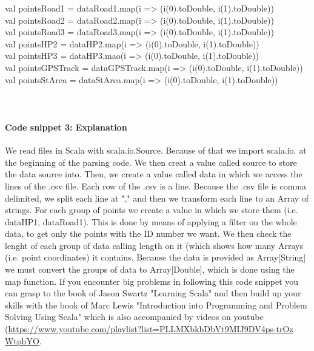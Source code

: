 \documentclass {article}
\begin{document}
val pointsRoad1 = dataRoad1.map(i => (i(0).toDouble, i(1).toDouble))\\
val pointsRoad2 = dataRoad2.map(i => (i(0).toDouble, i(1).toDouble))\\
val pointsRoad3 = dataRoad3.map(i => (i(0).toDouble, i(1).toDouble))\\
val pointsHP2 = dataHP2.map(i => (i(0).toDouble, i(1).toDouble))\\
val pointsHP3 = dataHP3.mao(i => (i(0).toDouble, i(1).toDouble)) \\
val pointsGPSTrack = dataGPSTrack.map(i => (i(0).toDouble, i(1).toDouble))\\
val pointsStArea = dataStArea.map(i => (i(0).toDouble, i(1).toDouble))\\
\\
\\
\paragraph{ Code snippet 3: Explanation}
We read files in Scala with scala.io.Source. Because of that we import scala.io.\underline{\space} at the beginning of the parsing code. We then creat a value called source to store the data source into. Then, we create a value called data in which we access the lines of the .csv file. Each row of the .csv is a line. Because the .csv file is comma delimited, we split each line at "," and then we transform each line to an Array of strings. 
For each group of points we create a value in which we store them (i.e. dataHP1, dataRoad1). This is done by means of applying a filter on the whole data, to get only the points with the ID number we want. 
We then check the lenght of each group of data calling length on it (which shows how many Arrays (i.e. point coordinates) it contains.       
Because the data is provided as Array[String] we must convert the groups of data to Array[Double], which is done using the map function.
 If you encounter big problems in following this code snippet you can grasp to the book of Jason Swartz "Learning Scala" \cite{swartz_learning_2015} and then build up your skills with the book of Marc Lewis "Introduction into Programming and Problem Solving Using Scala" \cite{lewis_introduction_2017} which is also accompanied by videos on youtube (\href{https://www.youtube.com/playlist?list=PLLMXbkbDbVt9MIJ9DV4ps-_trOzWtphYO}{https://www.youtube.com/playlist?list=PLLMXbkbDbVt9MIJ9DV4ps-\underline{\space}trOz\\WtphYO}.   
\\
\\
\end{document}
